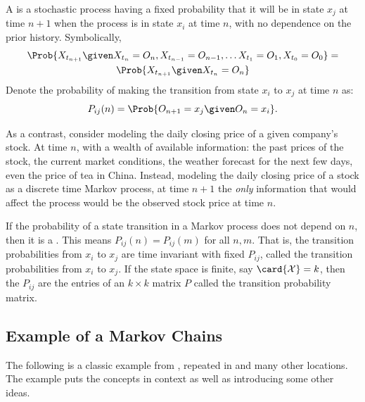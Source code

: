 \documentclass[12pt]{article}
\begin{document}
\begin{definition}
    A  is a stochastic process having
    a fixed probability that it will be in state \( x_j \) at time \(
    n+1 \) when the process is in state \( x_i \) at time \( n \), with
    no dependence on the prior history.%
    Symbolically,
    \begin{multline*}
        \Prob{X_{t_{n+1}} \given X_{t_{n}} = O_n, X_{t_{n-1}} = O_{n-1},
        \dots X_{t_1} = O_{1}, X_{t_0} = O_{0}} = \\
        \Prob{X_{t_{n+1}} \given X_{t_{n}} = O_{n}}
    \end{multline*}
    Denote the probability of making the transition from state \( x_i \)
    to \( x_j \) at time \( n \) as:
    \[
        P_{ij}(n)=\Prob{O_{n+1}=x_j \given O_n=x_i}.
    \]
\end{definition}

As a contrast, consider modeling the daily closing price of a given
company's stock.  At time \( n \), with a wealth of available
information:  the past prices of the stock, the current market
conditions, the weather forecast for the next few days, even the price
of tea in China. Instead, modeling the daily closing price of a stock as
a discrete time Markov process, at time \( n + 1 \) the \emph{only}
information that would affect the process would be the observed stock
price at time \( n \).

\begin{definition}
    If the probability of a state transition in a Markov process does
    not depend on \( n \), then it is a .%
    This means \( P_{ij}(n)=P_{ij}(m) \) for all \( n,m \). That is, the
    transition probabilities from \( x_i \) to \( x_j \) are time
    invariant with fixed \( P_{ij} \), called the transition
    probabilities from \( x_i \) to \( x_j \).  If the state space is
    finite, say \( \card{\mathcal{X}} = k \), then the \( P_{ij} \) are
    the entries of an \( k \times k \) matrix \( P \) called the
    transition probability matrix.
\end{definition}

\subsection*{Example of a Markov Chains}

The following is a classic example from
\cite{kemeny74}, repeated in
\cite{grinstead97} and many other locations.  The example puts the
concepts in context as well as introducing some other ideas.
\end{document}
